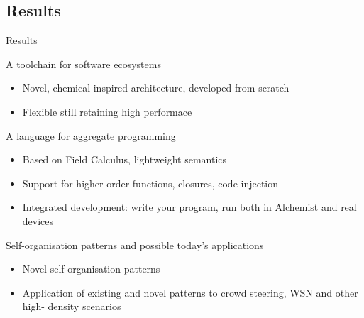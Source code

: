 \documentclass[presentation]{beamer}\mode<presentation>{\usetheme{sapere}}
\begin{document}
\subsection*{Results}
\begin{frame}{Results}
\begin{block}{A toolchain for software ecosystems}
\begin{itemize}
 \item Novel, chemical inspired architecture, developed from scratch
 \item Flexible still retaining high performace
\end{itemize}
\end{block}
\begin{block}{A language for aggregate programming \cite{protelis}}
\begin{itemize}
 \item Based on Field Calculus, lightweight semantics
 \item Support for higher order functions, closures, code injection
 \item Integrated development: write your program, run both in Alchemist and real devices
\end{itemize}
\end{block}
\begin{block}{Self-organisation patterns and possible today's applications}
\begin{itemize}
  \item Novel self-organisation patterns
  \item Application of existing and novel patterns to crowd steering, WSN and other high- density scenarios
\end{itemize}
\end{block}
\end{frame}
\end{document}
